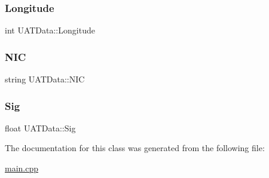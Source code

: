 \mbox{\label{classUATData_a68f21f5af40cb1412ed4bc69a3e82305}} 
\subsubsection{\texorpdfstring{Longitude}{Longitude}}
{\footnotesize\ttfamily int U\+A\+T\+Data\+::\+Longitude}

\mbox{\label{classUATData_ada1643b5e42b79e4a27bbf6d20505ef9}} 
\subsubsection{\texorpdfstring{N\+IC}{NIC}}
{\footnotesize\ttfamily string U\+A\+T\+Data\+::\+N\+IC}

\mbox{\label{classUATData_a62c8c4089c4dc59347fca7cc569332b5}} 
\subsubsection{\texorpdfstring{Sig}{Sig}}
{\footnotesize\ttfamily float U\+A\+T\+Data\+::\+Sig}



The documentation for this class was generated from the following file\+:\begin{DoxyCompactItemize}
\item 
\mbox{\hyperlink{main_8cpp}{main.\+cpp}}\end{DoxyCompactItemize}
